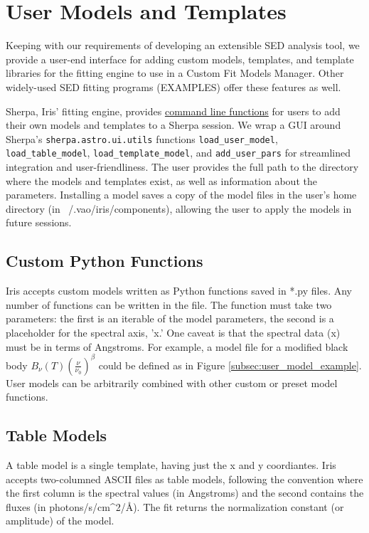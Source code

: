 \section{User Models and Templates}
\label{sec:usermodels}

Keeping with our requirements of developing an extensible SED analysis tool, we provide a user-end interface for adding custom models, templates, and template libraries for the fitting engine to use in a Custom Fit Models Manager. Other widely-used SED fitting programs (EXAMPLES) offer these features as well.

Sherpa, Iris' fitting engine, provides \underline{command line functions} for users to add their own models and templates to a Sherpa session. We wrap a GUI around Sherpa's \texttt{sherpa.astro.ui.utils} functions \texttt{load_user_model}, \texttt{load_table_model}, \texttt{load_template_model}, and \texttt{add_user_pars} for streamlined integration and user-friendliness. The user provides the full path to the directory where the models and templates exist, as well as information about the parameters. Installing a model saves a copy of the model files in the user's home directory (in ~/.vao/iris/components), allowing the user to apply the models in future sessions.


\subsection{Custom Python Functions}
Iris accepts custom models written as Python functions saved in *.py files. Any number of functions can be written in the file. The function must take two parameters: the first is an iterable of the model parameters, the second is a placeholder for the spectral axis, 'x.' One caveat is that the spectral data (x) must be in terms of Angstroms. For example, a model file for a modified black body
\(B_{\nu}(T) \left(\frac{\nu}{\nu_{0}}\right)^{\beta}\)
could be defined as in Figure \ref{subsec:user_model_example}. User models can be arbitrarily combined with other custom or preset model functions.

\subsection{Table Models}
A table model is a single template, having just the x and y coordiantes. Iris accepts two-columned ASCII files as table models, following the convention where the first column is the spectral values (in Angstroms) and the second contains the fluxes (in photons/s/cm^{2}/\AA). The fit returns the normalization constant (or amplitude) of the model.

